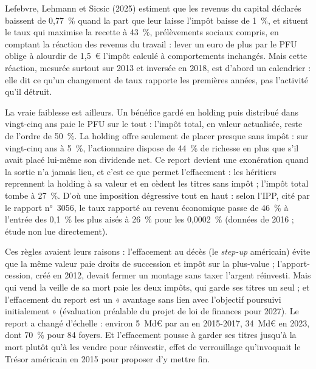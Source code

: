 
Lefebvre, Lehmann et Sicsic (2025) estiment que les revenus du capital déclarés baissent de 0,77~\% quand la part que
leur laisse l'impôt baisse de 1~\%, et situent le taux qui maximise la recette à 43~\%, prélèvements sociaux compris,
en comptant la réaction des revenus du travail : lever un euro de plus par le PFU oblige à alourdir de 1,5~€ l'impôt
calculé à comportements inchangés. Mais cette réaction, mesurée surtout sur 2013 et inversée en 2018, est d'abord un
calendrier : elle dit ce qu'un changement de taux rapporte les premières années, pas l'activité qu'il détruit.

La vraie faiblesse est ailleurs. Un bénéfice gardé en holding puis distribué dans vingt-cinq ans paie le PFU sur le
tout : l'impôt total, en valeur actualisée, reste de l'ordre de 50~\%. La holding offre seulement de placer presque
sans impôt : sur vingt-cinq ans à 5~\%, l'actionnaire dispose de 44~\% de richesse en plus que s'il avait placé
lui-même son dividende net. Ce report devient une exonération quand la sortie n'a jamais lieu, et c'est ce que
permet l'effacement : les héritiers reprennent la holding à sa valeur et en cèdent les titres sans impôt ; l'impôt
total tombe à 27~\%. D'où une imposition dégressive tout en haut : selon l'IPP, cité par le rapport n°~3056, le taux
rapporté au revenu économique passe de 46~\% à l'entrée des 0,1~\% les plus aisés à 26~\% pour les 0,0002~\%
(données de 2016 ; étude non lue directement).

Ces règles avaient leurs raisons : l'effacement au décès (le \emph{step-up} américain) évite que la même valeur
paie droits de succession et impôt sur la plus-value ; l'apport-cession, créé en 2012, devait fermer un montage sans
taxer l'argent réinvesti. Mais qui vend la veille de sa mort paie les deux impôts, qui garde ses titres un seul ; et l'effacement du report est un « avantage sans lien avec l'objectif
poursuivi initialement » (évaluation préalable du projet de loi de finances pour 2027). Le report a changé
d'échelle : environ 5~Md€ par an en 2015-2017, 34~Md€ en 2023, dont 70~\% pour 84 foyers. Et l'effacement pousse à
garder ses titres jusqu'à la mort plutôt qu'à les vendre pour réinvestir, effet de verrouillage qu'invoquait le
Trésor américain en 2015 pour proposer d'y mettre fin.

